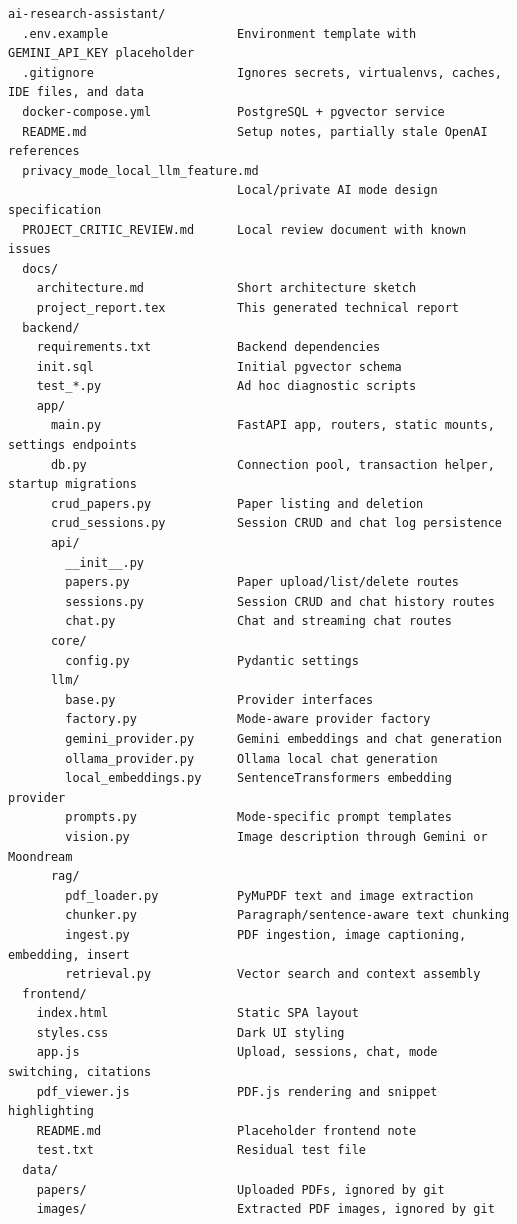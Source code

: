 \documentclass[11pt,a4paper]{report}
\begin{document}
\begin{lstlisting}[caption={Project directory tree}, label={lst:tree}]
ai-research-assistant/
  .env.example                  Environment template with GEMINI_API_KEY placeholder
  .gitignore                    Ignores secrets, virtualenvs, caches, IDE files, and data
  docker-compose.yml            PostgreSQL + pgvector service
  README.md                     Setup notes, partially stale OpenAI references
  privacy_mode_local_llm_feature.md
                                Local/private AI mode design specification
  PROJECT_CRITIC_REVIEW.md      Local review document with known issues
  docs/
    architecture.md             Short architecture sketch
    project_report.tex          This generated technical report
  backend/
    requirements.txt            Backend dependencies
    init.sql                    Initial pgvector schema
    test_*.py                   Ad hoc diagnostic scripts
    app/
      main.py                   FastAPI app, routers, static mounts, settings endpoints
      db.py                     Connection pool, transaction helper, startup migrations
      crud_papers.py            Paper listing and deletion
      crud_sessions.py          Session CRUD and chat log persistence
      api/
        __init__.py
        papers.py               Paper upload/list/delete routes
        sessions.py             Session CRUD and chat history routes
        chat.py                 Chat and streaming chat routes
      core/
        config.py               Pydantic settings
      llm/
        base.py                 Provider interfaces
        factory.py              Mode-aware provider factory
        gemini_provider.py      Gemini embeddings and chat generation
        ollama_provider.py      Ollama local chat generation
        local_embeddings.py     SentenceTransformers embedding provider
        prompts.py              Mode-specific prompt templates
        vision.py               Image description through Gemini or Moondream
      rag/
        pdf_loader.py           PyMuPDF text and image extraction
        chunker.py              Paragraph/sentence-aware text chunking
        ingest.py               PDF ingestion, image captioning, embedding, insert
        retrieval.py            Vector search and context assembly
  frontend/
    index.html                  Static SPA layout
    styles.css                  Dark UI styling
    app.js                      Upload, sessions, chat, mode switching, citations
    pdf_viewer.js               PDF.js rendering and snippet highlighting
    README.md                   Placeholder frontend note
    test.txt                    Residual test file
  data/
    papers/                     Uploaded PDFs, ignored by git
    images/                     Extracted PDF images, ignored by git
\end{lstlisting}
\end{document}
